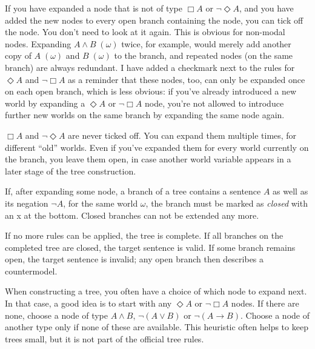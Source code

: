If you have expanded a node that is not of type $\Box A$ or $\neg \Diamond A$,
and you have added the new nodes to every open branch containing the node, you
can tick off the node. You don't need to look at it again. This is obvious for
non-modal nodes. Expanding $A \land B \; (\omega)$ twice, for example, would
merely add another copy of $A\;(\omega)$ and $B\;(\omega)$ to the branch, and
repeated nodes (on the same branch) are always redundant. I have added a
checkmark next to the rules for $\Diamond A$ and $\neg \Box A$ as a reminder
that these nodes, too, can only be expanded once on each open branch, which is
less obvious: if you've already introduced a new world by expanding a
$\Diamond A$ or $\neg \Box A$ node, you're not allowed to introduce further new
worlds on the same branch by expanding the same node again.

$\Box A$ and $\neg \Diamond A$ are never ticked off. You can expand them
multiple times, for different ``old'' worlds. Even if you've expanded them for
every world currently on the branch, you leave them open, in case another world
variable appears in a later stage of the tree construction.

If, after expanding some node, a branch of a tree contains a sentence $A$ as
well as its negation $\neg A$, for the same world $\omega$, the branch must be
marked as \emph{closed} with an {\sffamily x} at the bottom. Closed
branches can not be extended any more.


If no more rules can be applied, the tree is complete. If all branches on the
completed tree are closed, the target sentence is valid. If some branch remains
open, the target sentence is invalid; any open branch then describes a
countermodel.

When constructing a tree, you often have a choice of which node to expand next.
In that case, a good idea is to start with any $\Diamond A$ or $\neg \Box A$
nodes. If there are none, choose a node of type $A \land B$, $\neg (A \lor B)$
or $\neg(A \to B)$. Choose a node of another type only if none of these are
available. This heuristic often helps to keep trees small, but it is not part of
the official tree rules.

